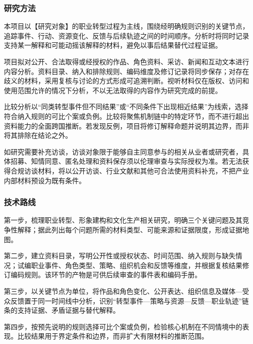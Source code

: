 \justifying
\NSFCBodyText

\subsubsection{研究方法}

本项目以【研究对象】的职业转型过程为主线，围绕经明确规则识别的关键节点，追踪事件、行动、资源变化、反馈与后续轨迹之间的时间顺序。分析时将同时记录支持某一解释和可能动摇该解释的材料，避免以事后结果替代过程证据。

项目拟对公开、合法取得或经授权的作品、角色资料、采访、新闻和互动文本进行内容分析。资料目录、纳入和排除规则、编码维度及修订记录将同步保存；对存在歧义的材料，采用复核与讨论的方式形成可追溯判断。视听材料仅在版权、访问和使用范围允许的情况下分析，不以无法取得的内容作为研究完成的前提。

比较分析以“同类转型事件但不同结果”或“不同条件下出现相近结果”为线索，选择符合纳入规则的可比个案或负例。比较将聚焦机制链中的特定环节，而不进行超出资料能力的全面跨国推断。若发现反例，项目将修订解释命题并说明其边界，而非将其排除在结论之外。

如研究需要补充访谈，访谈对象限于能够自主同意参与的相关从业者或研究者，具体招募、知情同意、匿名处理和资料保存须以伦理审查与实际授权为准。若无法获得合规访谈材料，将以公开访谈、行业文献和其他可合法使用资料补充，不把产业内部材料预设为既有条件。

\subsubsection{技术路线}

第一步，梳理职业转型、形象建构和文化生产相关研究，明确三个关键问题及其竞争性解释；据此列出每个问题所需的材料类型、可能来源和证据限度，形成证据地图。

第二步，建立资料目录，写明公开性或授权状态、时间范围、纳入规则与缺失情况；试编职业事件、角色类型、策略、组织机会和反馈等维度，并根据复核结果修订编码规则。该环节的产物是可供后续审查的事件表和编码手册。

第三步，以关键节点为单位，将作品和角色变化、公开表达、组织信息及媒体---受众反馈置于同一时间线中分析，识别“转型事件---策略与资源---反馈---职业轨迹”链条的支持证据、矛盾证据与替代解释。

第四步，按预先说明的规则选择可比个案或负例，检验核心机制在不同情境中的表现。比较结果用于界定条件和边界，而非扩大有限材料的推断范围。

